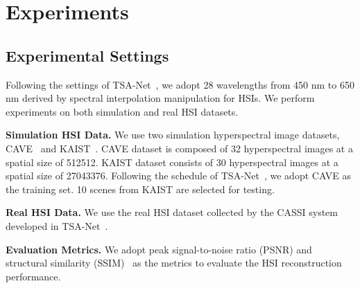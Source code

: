 \documentclass[10pt,twocolumn,letterpaper]{article}
\begin{document}
\vspace{-1.5mm}
\section{Experiments}
\vspace{-0.5mm}
\subsection{Experimental Settings}
\vspace{-0.5mm}
Following the settings of TSA-Net~\cite{tsa_net}, we adopt 28 wavelengths from 450 nm to 650 nm derived by spectral interpolation manipulation for HSIs. We perform experiments on both simulation and real HSI datasets.


\noindent \textbf{Simulation HSI Data.} We use two simulation hyperspectral image datasets, CAVE~\cite{cave} and KAIST~\cite{kaist}. CAVE dataset is composed of 32 hyperspectral images at a spatial size of 512512. KAIST dataset consists of 30 hyperspectral images at a spatial size of 27043376. Following  the schedule of  TSA-Net~\cite{tsa_net}, we adopt CAVE as the training set. 10 scenes from KAIST are  selected for testing. 

\noindent \textbf{Real HSI Data.} We use the real HSI dataset   collected by the CASSI system developed in TSA-Net~\cite{tsa_net}.

\noindent \textbf{Evaluation Metrics.} We adopt peak signal-to-noise ratio (PSNR) and structural similarity (SSIM)~\cite{ssim} as the metrics to evaluate the HSI  reconstruction performance.
\end{document}
